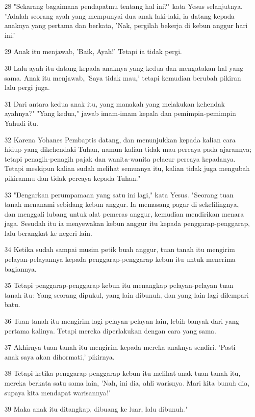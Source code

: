 \par 28 "Sekarang bagaimana pendapatmu tentang hal ini?" kata Yesus selanjutnya. "Adalah seorang ayah yang mempunyai dua anak laki-laki, ia datang kepada anaknya yang pertama dan berkata, 'Nak, pergilah bekerja di kebun anggur hari ini.'
\par 29 Anak itu menjawab, 'Baik, Ayah!' Tetapi ia tidak pergi.
\par 30 Lalu ayah itu datang kepada anaknya yang kedua dan mengatakan hal yang sama. Anak itu menjawab, 'Saya tidak mau,' tetapi kemudian berubah pikiran lalu pergi juga.
\par 31 Dari antara kedua anak itu, yang manakah yang melakukan kehendak ayahnya?" "Yang kedua," jawab imam-imam kepala dan pemimpin-pemimpin Yahudi itu.
\par 32 Karena Yohanes Pembaptis datang, dan menunjukkan kepada kalian cara hidup yang dikehendaki Tuhan, namun kalian tidak mau percaya pada ajarannya; tetapi penagih-penagih pajak dan wanita-wanita pelacur percaya kepadanya. Tetapi meskipun kalian sudah melihat semuanya itu, kalian tidak juga mengubah pikiranmu dan tidak percaya kepada Tuhan."
\par 33 "Dengarkan perumpamaan yang satu ini lagi," kata Yesus. "Seorang tuan tanah menanami sebidang kebun anggur. Ia memasang pagar di sekelilingnya, dan menggali lubang untuk alat pemeras anggur, kemudian mendirikan menara jaga. Sesudah itu ia menyewakan kebun anggur itu kepada penggarap-penggarap, lalu berangkat ke negeri lain.
\par 34 Ketika sudah sampai musim petik buah anggur, tuan tanah itu mengirim pelayan-pelayannya kepada penggarap-penggarap kebun itu untuk menerima bagiannya.
\par 35 Tetapi penggarap-penggarap kebun itu menangkap pelayan-pelayan tuan tanah itu: Yang seorang dipukul, yang lain dibunuh, dan yang lain lagi dilempari batu.
\par 36 Tuan tanah itu mengirim lagi pelayan-pelayan lain, lebih banyak dari yang pertama kalinya. Tetapi mereka diperlakukan dengan cara yang sama.
\par 37 Akhirnya tuan tanah itu mengirim kepada mereka anaknya sendiri. 'Pasti anak saya akan dihormati,' pikirnya.
\par 38 Tetapi ketika penggarap-penggarap kebun itu melihat anak tuan tanah itu, mereka berkata satu sama lain, 'Nah, ini dia, ahli warisnya. Mari kita bunuh dia, supaya kita mendapat warisannya!'
\par 39 Maka anak itu ditangkap, dibuang ke luar, lalu dibunuh."
